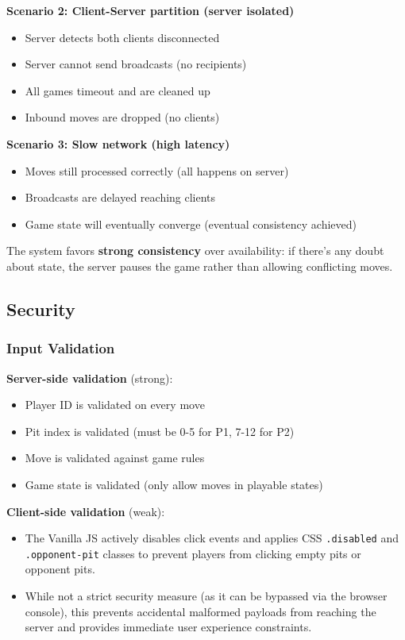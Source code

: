 \documentclass{scrartcl}
\begin{document}
\textbf{Scenario 2: Client-Server partition (server isolated)}

\begin{itemize}
  \item Server detects both clients disconnected
  \item Server cannot send broadcasts (no recipients)
  \item All games timeout and are cleaned up
  \item Inbound moves are dropped (no clients)
\end{itemize}

\textbf{Scenario 3: Slow network (high latency)}

\begin{itemize}
  \item Moves still processed correctly (all happens on server)
  \item Broadcasts are delayed reaching clients
  \item Game state will eventually converge (eventual consistency achieved)
\end{itemize}

The system favors \textbf{strong consistency} over availability: if there's any doubt about state,
the server pauses the game rather than allowing conflicting moves.

\subsection{Security}\label{security}


\subsubsection{Input Validation}

\textbf{Server-side validation} (strong):

\begin{itemize}
  \item Player ID is validated on every move
  \item Pit index is validated (must be 0-5 for P1, 7-12 for P2)
  \item Move is validated against game rules
  \item Game state is validated (only allow moves in playable states)
\end{itemize}

\textbf{Client-side validation} (weak):

\begin{itemize}
  \item The Vanilla JS actively disables click events and applies CSS \texttt{.disabled} and \texttt{.opponent-pit} classes to prevent players from clicking empty pits or opponent pits.
  \item While not a strict security measure (as it can be bypassed via the browser console), this prevents accidental malformed payloads from reaching the server and provides immediate user experience constraints.
\end{itemize}
\end{document}
